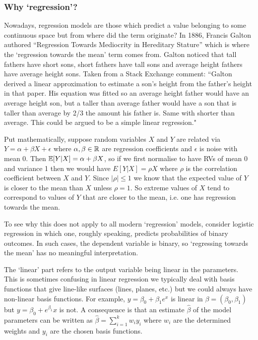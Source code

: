 \documentclass[11pt]{article}
\begin{document}

\subsubsection{Why `regression'?}

Nowadays, regression models are those which predict a value belonging to some continuous space but from where did the term originate? In 1886, Francis Galton authored ``Regression Towards Mediocrity in Hereditary Stature'' which is where the `regression towards the mean' term comes from. Galton noticed that tall fathers have short sons, short fathers have tall sons and average height fathers have average height sons. Taken from a Stack Exchange comment: ``Galton derived a linear approximation to estimate a son's height from the father's height in that paper. His equation was fitted so an average height father would have an average height son, but a taller than average father would have a son that is taller than average by 2/3 the amount his father is. Same with shorter than average. This could be argued to be a simple linear regression."

Put mathematically, suppose random variables $X$ and $Y$ are related via $Y=\alpha+\beta X+\epsilon$ where $\alpha,\beta\in\mathbb{R}$ are regression coefficients and $\epsilon$ is noise with mean $0$. Then $\mathbb{E}[Y|X]=\alpha+\beta X$, so if we first normalise to have RVs of mean 0 and variance 1 then we would have $E[Y|X]=\rho X$ where $\rho$ is the correlation coefficient between $X$ and $Y$. Since $|\rho|\leq1$ we know that the expected value of $Y$ is closer to the mean than $X$ unless $\rho=1$. So extreme values of $X$ tend to correspond to values of $Y$ that are closer to the mean, i.e. one has regression towards the mean.

To see why this does not apply to all modern `regression' models, consider logistic regression in which one, roughly speaking, predicts probabilities of binary outcomes. In such cases, the dependent variable is binary, so `regressing towards the mean' has no meaningful interpretation.

The `linear' part refers to the output variable being linear in the parameters. This is sometimes confusing in linear regression we typically deal with basis functions that give line-like surfaces (lines, planes, etc.) but we could always have non-linear basis functions. For example, $y=\beta_0+\beta_1 e^x$ is linear in $\beta=(\beta_0,\beta_1)$ but $y=\beta_0+e^{\beta_1}x$ is not. A consequence is that an estimate $\hat{\beta}$ of the model parameters can be written as $\hat{\beta}=\sum_{i=1}^k w_iy_i$ where $w_i$ are the determined weights and $y_i$ are the chosen basis functions.
\end{document}
